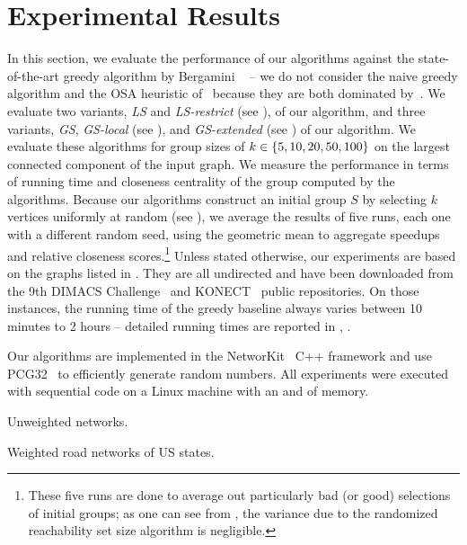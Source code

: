 \section{Experimental Results}
\label{sec:lsh-gc-experiments-ls}
%
In this section, we evaluate the performance of our algorithms against the
state-of-the-art greedy algorithm by Bergamini
\etal~\cite{DBLP:conf/alenex/BergaminiGM18} -- we do not consider the naive
greedy algorithm and the OSA heuristic of~\cite{DBLP:conf/adc/ChenWW16} because
they are both dominated by~\cite{DBLP:conf/alenex/BergaminiGM18}.
We evaluate two variants, \emph{LS} and \emph{LS-restrict}
(see ), of our \localswaps algorithm, and three variants,
\emph{GS}, \emph{GS-local} (see ), and \emph{GS-extended}
(see ) of our \growshrink algorithm.
%
We evaluate these algorithms for group sizes of $k \in \set{5, 10, 20, 50, 100}$ on
the largest connected component of the input graph. We measure the performance
in terms of running time and closeness centrality of the group computed by the
algorithms.
%
Because our algorithms construct an initial group $S$ by selecting $k$ vertices
uniformly at random (see ), we average the results
of five runs, each one with a different random seed, using the geometric mean to
aggregate speedups and relative closeness scores.\footnote{These five runs are done
to average out particularly bad (or good) selections of initial groups; as one can see
from , the variance due to the randomized reachability set size
algorithm is negligible.}
%
Unless stated otherwise, our experiments are based on the graphs listed in
. They are all undirected and have been downloaded
from the 9th DIMACS Challenge~\cite{demetrescu2009shortest} and
KONECT~\cite{kunegis2013konect} public repositories.
On those instances, the running time of the greedy baseline always varies
between 10 minutes to 2 hours -- detailed running times are reported in
,
.

Our algorithms are implemented in the
NetworKit~\cite{DBLP:journals/netsci/StaudtSM16} C++ framework and use
PCG32~\cite{o2014pcg} to efficiently generate random numbers.
All experiments were executed with sequential code on a Linux machine
with an \egocpu and \egoram of memory.

\begin{table}
\centering\footnotesize
{}
\label{tab:lsh-gc-heu-instances}
\begin{subtable}[t]{.6\textwidth}
\centering
\caption{Unweighted networks.}
\label{tab:lsh-gc-heu-unweighted}

\end{subtable}\hfill
\begin{subtable}[t]{.39\textwidth}
\centering
\caption{Weighted road networks of US states.}
\label{tab:lsh-gc-heu-weighted}

\end{subtable}
\end{table}

